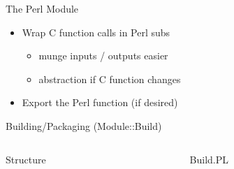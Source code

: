 \documentclass{beamer}
\begin{document}
\begin{frame}[fragile]{The Perl Module}
  \begin{block}{}
    \scriptsize
    
  \end{block}
  \begin{itemize}
    \item Wrap C function calls in Perl subs
    \begin{itemize}
      \item munge inputs / outputs easier
      \item abstraction if C function changes
    \end{itemize}
    \item Export the Perl function (if desired)
  \end{itemize}
\end{frame}

\begin{frame}{Building/Packaging (Module::Build)}
  \begin{columns}
    \begin{column}{0.49\linewidth}
      \begin{block}{Structure}
      \end{block}
      \vspace{4mm}
    \end{column}
    \begin{column}{0.49\linewidth}
      \scriptsize
      \begin{block}{Build.PL}
        
      \end{block}
    \end{column}
  \end{columns}
\end{frame}
\end{document}
